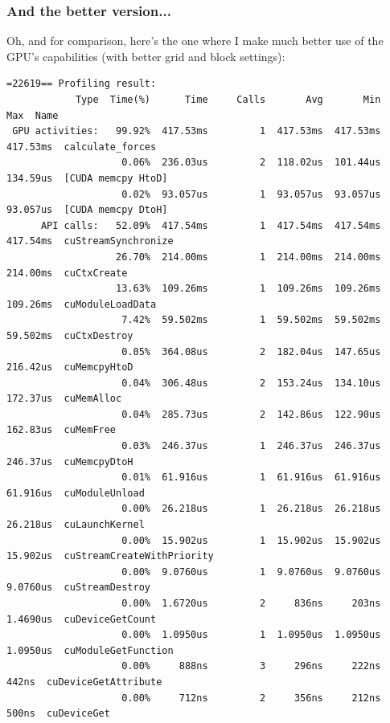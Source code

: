 \begin{frame}[fragile]
\frametitle{And the better version...}


Oh, and for comparison, here's the one where I make much better use of the GPU's capabilities (with better grid and block settings):

{\tiny
\begin{verbatim}
=22619== Profiling result:
            Type  Time(%)      Time     Calls       Avg       Min       Max  Name
 GPU activities:   99.92%  417.53ms         1  417.53ms  417.53ms  417.53ms  calculate_forces
                    0.06%  236.03us         2  118.02us  101.44us  134.59us  [CUDA memcpy HtoD]
                    0.02%  93.057us         1  93.057us  93.057us  93.057us  [CUDA memcpy DtoH]
      API calls:   52.09%  417.54ms         1  417.54ms  417.54ms  417.54ms  cuStreamSynchronize
                   26.70%  214.00ms         1  214.00ms  214.00ms  214.00ms  cuCtxCreate
                   13.63%  109.26ms         1  109.26ms  109.26ms  109.26ms  cuModuleLoadData
                    7.42%  59.502ms         1  59.502ms  59.502ms  59.502ms  cuCtxDestroy
                    0.05%  364.08us         2  182.04us  147.65us  216.42us  cuMemcpyHtoD
                    0.04%  306.48us         2  153.24us  134.10us  172.37us  cuMemAlloc
                    0.04%  285.73us         2  142.86us  122.90us  162.83us  cuMemFree
                    0.03%  246.37us         1  246.37us  246.37us  246.37us  cuMemcpyDtoH
                    0.01%  61.916us         1  61.916us  61.916us  61.916us  cuModuleUnload
                    0.00%  26.218us         1  26.218us  26.218us  26.218us  cuLaunchKernel
                    0.00%  15.902us         1  15.902us  15.902us  15.902us  cuStreamCreateWithPriority
                    0.00%  9.0760us         1  9.0760us  9.0760us  9.0760us  cuStreamDestroy
                    0.00%  1.6720us         2     836ns     203ns  1.4690us  cuDeviceGetCount
                    0.00%  1.0950us         1  1.0950us  1.0950us  1.0950us  cuModuleGetFunction
                    0.00%     888ns         3     296ns     222ns     442ns  cuDeviceGetAttribute
                    0.00%     712ns         2     356ns     212ns     500ns  cuDeviceGet
\end{verbatim}
}


\end{frame}


